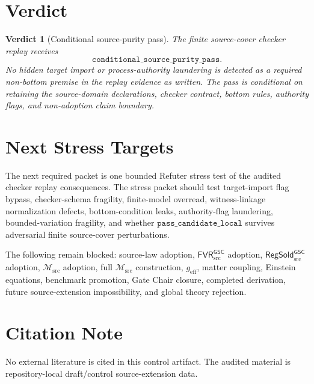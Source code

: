 \documentclass[11pt]{article}
\newcommand{\Msrc}{\mathcal{M}_{\mathrm{src}}}
\newcommand{\geff}{g_{\mathrm{eff}}}
\newcommand{\RegSold}{\mathsf{RegSold}_{\mathrm{src}}^{\mathsf{GSC}}}
\newcommand{\FVRSrc}{\mathsf{FVR}_{\mathrm{src}}^{\mathsf{GSC}}}
\newtheorem{verdict}{Verdict}
\begin{document}
\section{Verdict}

\begin{verdict}[Conditional source-purity pass]
The finite source-cover checker replay receives
\[
  \texttt{conditional\_source\_purity\_pass}.
\]
No hidden target import or process-authority laundering is detected as a
required non-bottom premise in the replay evidence as written. The pass is
conditional on retaining the source-domain declarations, checker contract,
bottom rules, authority flags, and non-adoption claim boundary.
\end{verdict}

\section{Next Stress Targets}

The next required packet is one bounded Refuter stress test of the audited
checker replay consequences. The stress packet should test target-import flag
bypass, checker-schema fragility, finite-model overread, witness-linkage
normalization defects, bottom-condition leaks, authority-flag laundering,
bounded-variation fragility, and whether \(\texttt{pass\_candidate\_local}\)
survives adversarial finite source-cover perturbations.

The following remain blocked: source-law adoption, \(\FVRSrc\) adoption,
\(\RegSold\) adoption, \(\Msrc\) adoption, full \(\Msrc\) construction,
\(\geff\), matter coupling, Einstein equations, benchmark promotion, Gate
Chair closure, completed derivation, future source-extension impossibility,
and global theory rejection.

\section*{Citation Note}

No external literature is cited in this control artifact. The audited material
is repository-local draft/control source-extension data.
\end{document}
